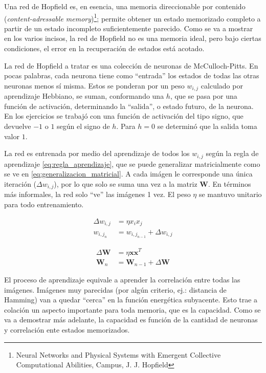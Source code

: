 \documentclass[11pt]{article} %
\begin{document}
Una red de Hopfield es, en esencia, una memoria direccionable por contenido (\textit{content-adressable memory})\footnote{Neural Networks and Physical Systems with Emergent Collective Computational Abilities, Campus, J. J. Hopfield }; permite obtener un estado memorizado completo a partir de un estado incompleto suficientemente parecido. Como se va a mostrar en los varios incisos, la red de Hopfield no es una memoria ideal, pero bajo ciertas condiciones, el error en la recuperación de estados está acotado. 

La red de Hopfield a tratar es una colección de neuronas de McCulloch-Pitts. En pocas palabras, cada neurona tiene como ``entrada'' los estados de todas las otras neuronas menos sí misma. Estos se ponderan por un peso $w_{i,j}$ calculado por aprendizaje Hebbiano, se suman, conformando una $h$, que se pasa por una función de activación, determinando la ``salida'', o estado futuro, de la neurona. En los ejercicios se trabajó con una función de activación del tipo signo, que devuelve $-1$ o $1$ según el signo de $h$. Para $h = 0$ se determinó que la salida toma valor $1$. 

La red es entrenada por medio del aprendizaje de todos los $w_{i,j}$ según la regla de aprendizaje \eqref{eq:regla_aprendizaje}, que se puede generalizar matricialmente como se ve en \eqref{eq:generalizacion_matricial}. A cada imágen le corresponde una única iteración ($\Delta w_{i,j}$), por lo que solo se suma una vez a la matriz $\mathbf{W}$. En términos más informales, la red solo ``ve'' las imágenes 1 vez.  El peso $\eta$ se mantuvo unitario para todo entrenamiento. 

\begin{equation}
\begin{split}
\Delta w_{i,j} &= \eta x_i x_j \\
w_{{i,j}_n} &= w_{{i,j} _{n-1}} + \Delta w_{i,j}
\end{split}
\label{eq:regla_aprendizaje}
\end{equation}

\begin{equation}
\begin{split}
\Delta\mathbf{W} &= \eta \mathbf{x} \mathbf{x}^T \\
\mathbf{W}_n &= \mathbf{W}_{n-1} + \Delta\mathbf{W}
\end{split}
\label{eq:generalizacion_matricial}
\end{equation}

El proceso de aprendizaje equivale a aprender la correlación entre todas las imágenes. Imágenes muy parecidas (por algún criterio, ej.: distancia de Hamming) van a quedar ``cerca'' en la función energética subyacente. Esto trae a colación un aspecto importante para toda memoria, que es la capacidad. Como se va a demostrar más adelante, la capacidad es función de la cantidad de neuronas y correlación ente estados memorizados. 
\end{document}
